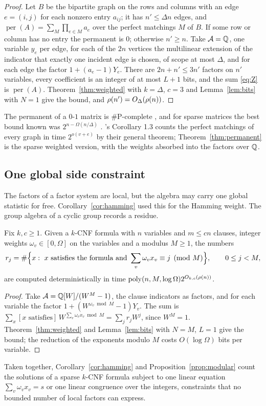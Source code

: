 \begin{proof}
Let $B$ be the bipartite graph on the rows and columns with an edge $e=(i,j)$ for
each nonzero entry $a_{ij}$; it has $n'\le\Delta n$ edges, and
$\operatorname{per}(A)=\sum_{M}\prod_{e\in M}a_e$ over the perfect matchings $M$
of $B$. If some row or column has no entry the permanent is $0$; otherwise
$n'\ge n$. Take $\mathcal{A}=\mathbb{Q}$, one variable $y_e$ per edge, for each of the $2n$
vertices the multilinear extension of the indicator that exactly one incident
edge is chosen, of scope at most $\Delta$, and for each edge the factor
$1+(a_e-1)Y_e$. There are $2n+n'\le3n'$ factors on $n'$ variables, every
coefficient is an integer of at most $L+1$ bits, and the sum \eqref{eq:Z} is
$\operatorname{per}(A)$. Theorem~\ref{thm:weighted} with $k=\Delta$, $c=3$ and
Lemma~\ref{lem:bits} with $N=1$ give the bound, and
$\rho(n')=O_\Delta(\rho(n))$.
\end{proof}

\begin{remark}
The permanent of a $0$-$1$ matrix is $\#$P-complete \cite{Val79}, and for
sparse matrices the best bound known was $2^{n-\Omega(n/\Delta)}$
\cite{CP15}. \oai{}'s Corollary 1.3 counts the perfect matchings of every graph
in time $2^{o(v+e)}$ by their general theorem; Theorem~\ref{thm:permanent}
is the sparse weighted version, with the weights absorbed into the factors over
$\mathbb{Q}$.
\end{remark}

\subsection{One global side constraint}\label{ssec:global}
The factors of a factor system are local, but the algebra may carry one global
statistic for free. Corollary~\ref{cor:hamming} used this for the Hamming weight.
The group algebra of a cyclic group records a residue.

\begin{proposition}\label{prop:modular}
Fix $k,c\ge1$. Given a $k$-CNF formula with $n$ variables and $m\le cn$ clauses,
integer weights $\omega_v\in[0,\Omega]$ on the variables and a modulus $M\ge1$, the
numbers
\[
  r_j=\#\Bigl\{x:\ x\text{ satisfies the formula and }\sum_v\omega_vx_v\equiv j\pmod M\Bigr\},\qquad 0\le j<M,
\]
are computed deterministically in time $\operatorname{poly}(n,M,\log\Omega)2^{O_{k,c}(\rho(n))}$.
\end{proposition}

\begin{proof}
Take $\mathcal{A}=\mathbb{Q}[W]/(W^{M}-1)$, the clause indicators as factors, and for each
variable the factor $1+(W^{\omega_v\bmod M}-1)Y_v$. The sum is
$\sum_x[\text{$x$ satisfies}]\,W^{\sum_v\omega_vx_v\bmod M}=\sum_jr_jW^{j}$, since
$W^{M}=1$. Theorem~\ref{thm:weighted} and Lemma~\ref{lem:bits} with $N=M$,
$L=1$ give the bound; the reduction of the exponents modulo $M$ costs
$O(\log\Omega)$ bits per variable.
\end{proof}

Taken together, Corollary~\ref{cor:hamming} and Proposition~\ref{prop:modular}
count the solutions of a sparse $k$-CNF formula subject to one linear equation
$\sum_v\omega_vx_v=s$ or one linear congruence over the integers, constraints
that no bounded number of local factors can express.
